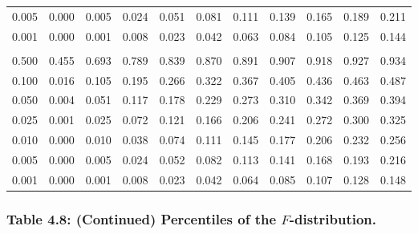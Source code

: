 \documentclass[
]{article}
\begin{document}
\begin{longtable}[t]{lrrrrrrrrrr}
\hspace{1em}0.005 & 0.000 & 0.005 & 0.024 & 0.051 & 0.081 & 0.111 & 0.139 & 0.165 & 0.189 & 0.211\\
\hspace{1em}0.001 & 0.000 & 0.001 & 0.008 & 0.023 & 0.042 & 0.063 & 0.084 & 0.105 & 0.125 & 0.144\\
\addlinespace[0.3em]
\multicolumn{11}{l}{\textbf{$k_2=\infty$}}\\
\hspace{1em}0.500 & 0.455 & 0.693 & 0.789 & 0.839 & 0.870 & 0.891 & 0.907 & 0.918 & 0.927 & 0.934\\
\hspace{1em}0.100 & 0.016 & 0.105 & 0.195 & 0.266 & 0.322 & 0.367 & 0.405 & 0.436 & 0.463 & 0.487\\
\hspace{1em}0.050 & 0.004 & 0.051 & 0.117 & 0.178 & 0.229 & 0.273 & 0.310 & 0.342 & 0.369 & 0.394\\
\hspace{1em}0.025 & 0.001 & 0.025 & 0.072 & 0.121 & 0.166 & 0.206 & 0.241 & 0.272 & 0.300 & 0.325\\
\hspace{1em}0.010 & 0.000 & 0.010 & 0.038 & 0.074 & 0.111 & 0.145 & 0.177 & 0.206 & 0.232 & 0.256\\
\hspace{1em}0.005 & 0.000 & 0.005 & 0.024 & 0.052 & 0.082 & 0.113 & 0.141 & 0.168 & 0.193 & 0.216\\
\hspace{1em}0.001 & 0.000 & 0.001 & 0.008 & 0.023 & 0.042 & 0.064 & 0.085 & 0.107 & 0.128 & 0.148\\
\bottomrule
\end{longtable}

\newpage

\subsubsection{\texorpdfstring{Table 4.8: (Continued) Percentiles of the
\(F\)-distribution.}{Table 4.8: (Continued) Percentiles of the F-distribution.}}\label{table-4.8-continued-percentiles-of-the-f-distribution.}
\end{document}
